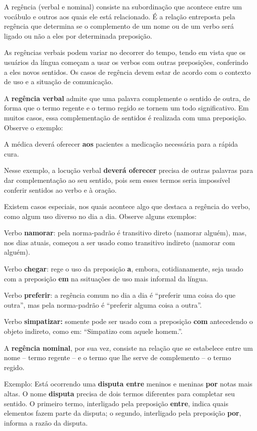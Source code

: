 {\begin{itemize}
\begin{itemize}
{A regência (verbal e nominal) consiste na subordinação que acontece
entre um vocábulo e outros aos quais ele está relacionado. É a relação
entreposta pela regência que determina se o complemento de um nome ou de
um verbo será ligado ou não a eles por determinada preposição.

As regências verbais podem variar no decorrer do tempo, tendo em vista
que os usuários da língua começam a usar os verbos com outras
preposições, conferindo a eles novos sentidos. Os casos de regência
devem estar de acordo com o contexto de uso e a situação de comunicação.

A \textbf{regência verbal} admite que uma palavra complemente o sentido
de outra, de forma que o termo regente e o termo regido se tornem um
todo significativo. Em muitos casos, essa complementação de sentidos é
realizada com uma preposição. Observe o exemplo:

A médica deverá oferecer \textbf{aos} pacientes a medicação necessária
para a rápida cura.

Nesse exemplo, a locução verbal \textbf{deverá oferecer} precisa de
outras palavras para dar complementação ao seu sentido, pois sem esses
termos seria impossível conferir sentidos ao verbo e à oração.

Existem casos especiais, nos quais acontece algo que destaca a regência
do verbo, como algum uso diverso no dia a dia. Observe alguns exemplos:

Verbo \textbf{namorar}: pela norma-padrão é transitivo direto (namorar
alguém), mas, nos dias atuais, começou a ser usado como transitivo
indireto (namorar com alguém).

Verbo \textbf{chegar}: rege o uso da preposição \textbf{a}, embora,
cotidianamente, seja usado com a preposição \textbf{em} na ssituações de
uso mais informal da língua.

Verbo \textbf{preferir}: a regência comum no dia a dia é ``preferir uma
coisa do que outra'', mas pela norma-padrão é ``preferir alguma coisa a
outra''.

Verbo \textbf{simpatizar:} somente pode ser usado com a preposição
\textbf{com} antecedendo o objeto indireto, como em: ``Simpatizo com
aquele homem.''.

A \textbf{regência nominal}, por sua vez, consiste na relação que se
estabelece entre um nome -- termo regente -- e o termo que lhe serve de
complemento -- o termo regido.

Exemplo: Está ocorrendo uma \textbf{disputa entre} meninos e meninas
\textbf{por} notas mais altas. O nome \textbf{disputa} precisa de dois
termos diferentes para completar seu sentido. O primeiro termo,
interligado pela preposição \textbf{entre}, indica quais elementos fazem
parte da disputa; o segundo, interligado pela preposição \textbf{por},
informa a razão da disputa.

}
\end{itemize}
\end{itemize}}
